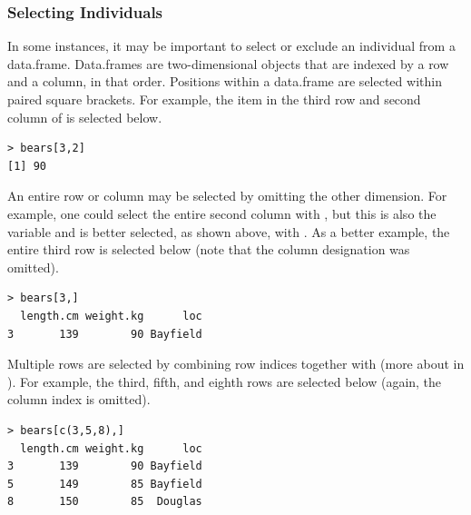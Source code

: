 \documentclass[10pt,openany]{book}\usepackage[]{graphicx}\usepackage[]{color}
\makeatletter
\newenvironment{kframe}{%
 \def\at@end@of@kframe{}%
 \ifinner\ifhmode%
  \def\at@end@of@kframe{\end{minipage}}%
  \begin{minipage}{\columnwidth}%
 \fi\fi%
 \def\FrameCommand##1{\hskip\@totalleftmargin \hskip-\fboxsep
 \colorbox{shadecolor}{##1}\hskip-\fboxsep
     \hskip-\linewidth \hskip-\@totalleftmargin \hskip\columnwidth}%
 \MakeFramed {\advance\hsize-\width
   \@totalleftmargin\z@ \linewidth\hsize
   \@setminipage}}%
 {\par\unskip\endMakeFramed%
 \at@end@of@kframe}
\newenvironment{knitrout}{}{} %
\makeatother
\begin{document}

\subsubsection{Selecting Individuals}  \label{sect:RSelectIndivs}
\vspace{-12pt}

In some instances, it may be important to select or exclude an individual from a data.frame.  Data.frames are two-dimensional objects that are indexed by a row and a column, in that order.  Positions within a data.frame are selected within paired square brackets.  For example, the item in the third row and second column of  is selected below.
\begin{knitrout}
\color{fgcolor}\begin{kframe}
\begin{verbatim}
> bears[3,2]
[1] 90
\end{verbatim}
\end{kframe}
\end{knitrout}


An entire row or column may be selected by omitting the other dimension.  For example, one could select the entire second column with , but this is also the  variable and is better selected, as shown above, with .  As a better example, the entire third row is selected below (note that the column designation was omitted).
\begin{knitrout}
\color{fgcolor}\begin{kframe}
\begin{verbatim}
> bears[3,]
  length.cm weight.kg      loc
3       139        90 Bayfield
\end{verbatim}
\end{kframe}
\end{knitrout}

Multiple rows are selected by combining row indices together with  (more about  in ).  For example, the third, fifth, and eighth rows are selected below (again, the column index is omitted).
\begin{knitrout}
\color{fgcolor}\begin{kframe}
\begin{verbatim}
> bears[c(3,5,8),]
  length.cm weight.kg      loc
3       139        90 Bayfield
5       149        85 Bayfield
8       150        85  Douglas
\end{verbatim}
\end{kframe}
\end{knitrout}
\end{document}
